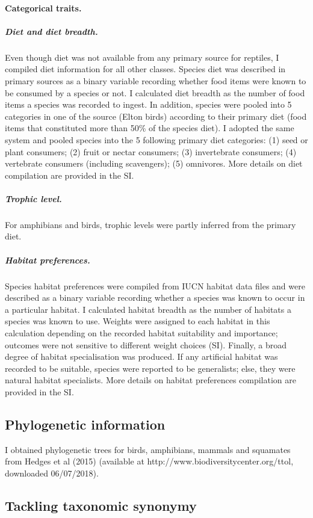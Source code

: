 \paragraph{Categorical traits.}
\subparagraph{Diet and diet breadth.} Even though diet was not available from any primary source for reptiles, I compiled diet information for all other classes. Species diet was described in primary sources as a binary variable recording whether food items were known to be consumed by a species or not. I calculated diet breadth as the number of food items a species was recorded to ingest. In addition,  species were pooled into 5 categories in one of the source (Elton birds) according to their primary diet (food items that constituted more than 50\% of the species diet). I adopted the same system and  pooled species into the 5 following primary diet categories: (1) seed or plant consumers; (2) fruit or nectar consumers; (3) invertebrate consumers; (4) vertebrate consumers (including scavengers); (5) omnivores. More details on diet compilation are provided in the SI. 
\subparagraph{Trophic level.} For amphibians and birds, trophic levels were partly inferred from the primary diet. 
\subparagraph{Habitat preferences.}
Species habitat preferences were compiled from IUCN habitat data files and were described as a binary variable recording whether a species was known to occur in a particular habitat. I calculated habitat breadth as the number of habitats a species was known to use. Weights were assigned to each habitat in this calculation depending on the recorded habitat suitability and importance; outcomes were not sensitive to different weight choices (SI). Finally, a broad degree of habitat specialisation was produced. If any artificial habitat was recorded to be suitable, species were reported to be generalists; else, they were natural habitat specialists. More details on habitat preferences compilation are provided in the SI. 

\subsection{Phylogenetic information}
I obtained phylogenetic trees for birds, amphibians, mammals and squamates from Hedges et al (2015) (available at http://www.biodiversitycenter.org/ttol, downloaded 06/07/2018).

\subsection{Tackling taxonomic synonymy}

